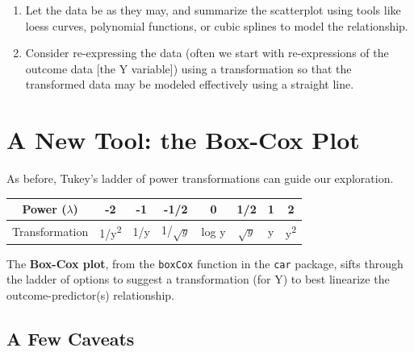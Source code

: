 \documentclass[
]{book}
\providecommand{\tightlist}{%
  \setlength{\itemsep}{0pt}\setlength{\parskip}{0pt}}
\begin{document}
\begin{enumerate}
\def\labelenumi{\alph{enumi}.}
\tightlist
\item
  Let the data be as they may, and summarize the scatterplot using tools like loess curves, polynomial functions, or cubic splines to model the relationship.
\item
  Consider re-expressing the data (often we start with re-expressions of the outcome data {[}the Y variable{]}) using a transformation so that the transformed data may be modeled effectively using a straight line.
\end{enumerate}

\hypertarget{a-new-tool-the-box-cox-plot}{%
\section{A New Tool: the Box-Cox Plot}\label{a-new-tool-the-box-cox-plot}}

As before, Tukey's ladder of power transformations can guide our exploration.

\begin{longtable}[]{@{}cccccccc@{}}
\toprule
Power (\(\lambda\)) & -2 & -1 & -1/2 & 0 & 1/2 & 1 & 2\tabularnewline
\midrule
\endhead
Transformation & 1/y\textsuperscript{2} & 1/y & 1/\(\sqrt{y}\) & log y & \(\sqrt{y}\) & y & y\textsuperscript{2}\tabularnewline
\bottomrule
\end{longtable}

The \textbf{Box-Cox plot}, from the \texttt{boxCox} function in the \texttt{car} package, sifts through the ladder of options to suggest a transformation (for Y) to best linearize the outcome-predictor(s) relationship.

\hypertarget{a-few-caveats}{%
\subsection{A Few Caveats}\label{a-few-caveats}}
\end{document}
